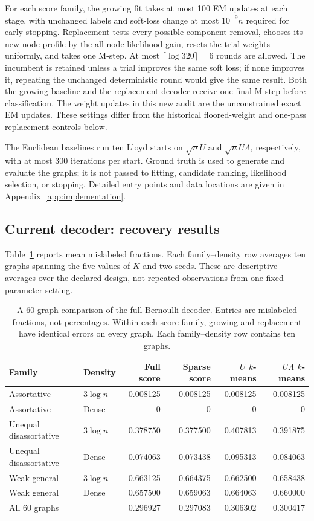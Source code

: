 \documentclass[11pt]{article}
\theoremstyle{definition}
\theoremstyle{remark}
\numberwithin{equation}{section}
\begin{document}
For each score family, the growing fit takes at most 100 EM updates at
each stage, with unchanged labels and soft-loss change at most $10^{-9}n$
required for early stopping. Replacement tests every possible component
removal, chooses its new node profile by the all-node likelihood gain,
resets the trial weights uniformly, and takes one M-step. At most
$\lceil\log 320\rceil=6$ rounds are allowed. The incumbent is retained unless
a trial improves the same soft loss; if none improves it, repeating the
unchanged deterministic round would give the same result. Both the growing
baseline and the replacement decoder receive one final M-step before
classification. The weight updates in this new audit are the unconstrained
exact EM updates. These settings differ from the historical floored-weight
and one-pass replacement controls below.

The Euclidean baselines run ten Lloyd starts on $\sqrt n U$ and
$\sqrt n U\Lambda$, respectively, with at most 300 iterations per start.
Ground truth is used to generate and evaluate the graphs; it is not passed
to fitting, candidate ranking, likelihood selection, or stopping. Detailed
entry points and data locations are given in Appendix~\ref{app:implementation}.

\subsection{Current decoder: recovery results}
Table~\ref{tab:general_density} reports mean mislabeled fractions. Each
family--density row averages ten graphs spanning the five values of $K$
and two seeds. These are descriptive averages over the declared design,
not repeated observations from one fixed parameter setting.

\begin{table}[tb]
\centering
\small
\setlength{\tabcolsep}{4pt}
\caption{A 60-graph comparison of the full-Bernoulli decoder. Entries
are mislabeled fractions, not percentages. Within each score family,
growing and replacement have identical errors on every graph. Each
family--density row contains ten graphs.}
\label{tab:general_density}
\begin{tabular}{llrrrr}
\toprule
Family&Density&Full score&Sparse score&$U$ $k$-means&$U\Lambda$ $k$-means\\
\midrule
Assortative&$3\log n$&0.008125&0.008125&0.008125&0.008125\\
Assortative&Dense&0&0&0&0\\
Unequal disassortative&$3\log n$&0.378750&0.377500&0.407813&0.391875\\
Unequal disassortative&Dense&0.074063&0.073438&0.095313&0.084063\\
Weak general&$3\log n$&0.663125&0.664375&0.662500&0.658438\\
Weak general&Dense&0.657500&0.659063&0.664063&0.660000\\
\midrule
All 60 graphs&&0.296927&0.297083&0.306302&0.300417\\
\bottomrule
\end{tabular}
\end{table}
\end{document}
